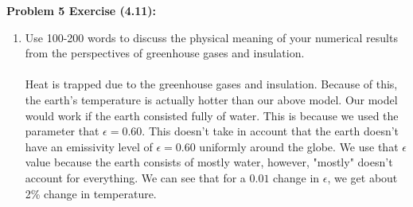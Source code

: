 \documentclass[11pt]{article}
\newenvironment{problem}[1]{\textbf{Problem #1: }}{\newpage}
\newenvironment{Shaded}{\begin{snugshade}}{\end{snugshade}}
\newcommand{\KeywordTok}[1]{\textcolor[rgb]{0.13,0.29,0.53}{\textbf{#1}}}
\newcommand{\NormalTok}[1]{#1}
\newcommand{\StringTok}[1]{\textcolor[rgb]{0.31,0.60,0.02}{#1}}
\begin{document}
\begin{problem}{5 Exercise (4.11)}
\begin{enumerate}[label = (\alph*)]
\begin{Shaded}
\end{Shaded}

\begin{verbatim}
##       Epsilon % from .60        ST % from ST(.60)
##  [1,]    0.55    -8.3333 -133.5727        11.4899
##  [2,]    0.56    -6.6667 -130.5978         9.0069
##  [3,]    0.57    -5.0000 -127.7401         6.6217
##  [4,]    0.58    -3.3333 -124.9931         4.3288
##  [5,]    0.59    -1.6667 -122.3506         2.1231
##  [6,]    0.60     0.0000 -119.8069         0.0000
##  [7,]    0.61     1.6667 -117.3569        -2.0450
##  [8,]    0.62     3.3333 -114.9956        -4.0159
##  [9,]    0.63     5.0000 -112.7185        -5.9165
## [10,]    0.64     6.6667 -110.5213        -7.7505
## [11,]    0.65     8.3333 -108.4000        -9.5211
\end{verbatim}

			\newpage	
			\item Use 100-200 words to discuss the physical meaning of your numerical results
			from the perspectives of greenhouse gases and insulation.
			\\ \\
			Heat is trapped due to the greenhouse gases and insulation.  Because of this, the earth's temperature is actually hotter than our above model.  Our model would work if the earth consisted fully of water.  This is because we used the parameter that $\epsilon = 0.60$.  This doesn't take in account that the earth doesn't have an emissivity level of $\epsilon = 0.60$ uniformly around the globe.  We use that $\epsilon$ value because the earth consists of mostly water, however, "mostly" doesn't account for everything. We can see that for a $0.01$ change in $\epsilon$, we get about 2\% change in temperature.
		\end{enumerate}
	\end{problem}
\end{document}
